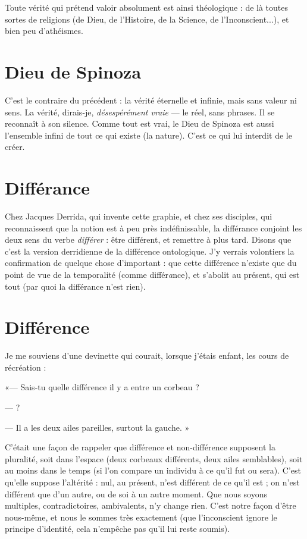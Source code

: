 Toute vérité qui prétend valoir absolument est ainsi théologique : de là
toutes sortes de religions (de Dieu, de l'Histoire, de la Science, de l’Inconscient...),
et bien peu d’athéismes.

\section{Dieu de Spinoza}
C'est le contraire du précédent : la vérité éternelle et
infinie, mais sans valeur ni sens. La vérité, dirais-je,
{\it désespérément vraie} — le réel, sans phrases. Il se reconnaît à son silence.
Comme tout est vrai, le Dieu de Spinoza est aussi l’ensemble infini de tout
ce qui existe (la nature). C’est ce qui lui interdit de le créer.

\section{Différance}
Chez Jacques Derrida, qui invente cette graphie, et chez ses
disciples, qui reconnaissent que la notion est à peu près
indéfinissable, la différance conjoint les deux sens du verbe {\it différer} : être différent,
et remettre à plus tard. Disons que c’est la version derridienne de la différence
ontologique. J’y verrais volontiers la confirmation de quelque chose
d’important : que cette différence n’existe que du point de vue de la temporalité
(comme différ{\it a}nce), et s’abolit au présent, qui est tout (par quoi la différance
n’est rien).

\section{Différence}
Je me souviens d’une devinette qui courait, lorsque j'étais
enfant, les cours de récréation :

«— Sais-tu quelle différence il y a entre un corbeau ?

— ?

— Il a les deux ailes pareilles, surtout la gauche. »

C'était une façon de rappeler que différence et non-différence supposent la
pluralité, soit dans l’espace (deux corbeaux différents, deux ailes semblables),
soit au moins dans le temps (si l’on compare un individu à ce qu’il fut ou sera).
C’est qu’elle suppose l’altérité : nul, au présent, n’est différent de ce qu’il est ;
on n’est différent que d’un autre, ou de soi à un autre moment. Que nous
soyons multiples, contradictoires, ambivalents, n’y change rien. C’est notre
façon d’être nous-même, et nous le sommes très exactement (que l’inconscient
ignore le principe d’identité, cela n’empêche pas qu’il lui reste soumis).

